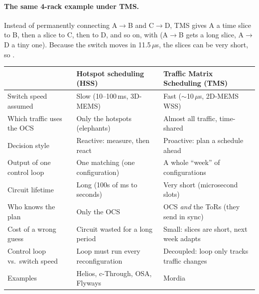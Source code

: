 \paragraph{The same 4-rack example under TMS.} Instead of permanently connecting A$\to$B and C$\to$D, TMS gives A a time slice to B, then a slice to C, then to D, and so on, with  (A$\to$B gets a long slice, A$\to$D a tiny one). Because the switch moves in 11.5\,$\mu$s, the slices can be very short, so .

\begin{center}
\small
\begin{tabularx}{\linewidth}{@{}l X X@{}}
\toprule
 & \textbf{Hotspot scheduling (HSS)} & \textbf{Traffic Matrix Scheduling (TMS)} \\
\midrule
Switch speed assumed & Slow (10--100\,ms, 3D-MEMS) & Fast ($\sim$10\,$\mu$s, 2D-MEMS WSS) \\
Which traffic uses the OCS & Only the hotspots (elephants) & Almost all traffic, time-shared \\
Decision style & Reactive: measure, then react & Proactive: plan a schedule ahead \\
Output of one control loop & One matching (one configuration) & A whole ``week'' of configurations \\
Circuit lifetime & Long (100s of ms to seconds) & Very short (microsecond slots) \\
Who knows the plan & Only the OCS & OCS \emph{and} the ToRs (they send in sync) \\
Cost of a wrong guess & Circuit wasted for a long period & Small: slices are short, next week adapts \\
Control loop vs.\ switch speed & Loop must run every reconfiguration & Decoupled: loop only tracks traffic changes \\
Examples & Helios, c-Through, OSA, Flyways & Mordia \\
\bottomrule
\end{tabularx}
\end{center}

